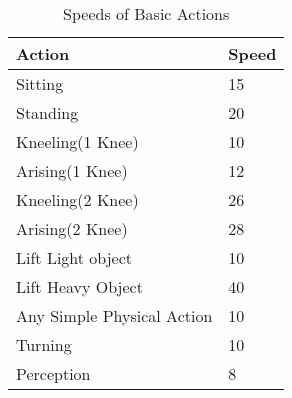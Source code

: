 \begin{table}[h]
	\begin{tabular}{l|l}
	Action						& Speed \\
	\hline
	Sitting						& 15 \\
	Standing					& 20 \\
	Kneeling(1 Knee)			& 10 \\
	Arising(1 Knee)				& 12 \\
	Kneeling(2 Knee)			& 26 \\
	Arising(2 Knee)				& 28 \\
	Lift Light object			&  10 \\
	Lift Heavy Object			 &  40 \\
	Any Simple Physical Action  &  10 \\
	Turning 					&  10 \\
	Perception					&  8 \\ 
	\end{tabular}
	\caption{Speeds of Basic Actions}\label{Table:Speed}
\end{table}
